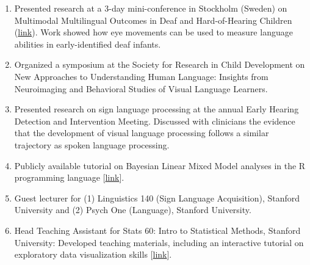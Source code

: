 \documentclass[svgnames,11pt]{article}
\begin{document}
\begin{enumerate}
\item Presented research at a 3-day mini-conference in Stockholm (Sweden) on Multimodal Multilingual Outcomes in Deaf and Hard-of-Hearing Children (\href{https://www.ntid.rit.edu/mmoworkshop/}{link}). Work showed how eye movements can be used to measure language abilities in early-identified deaf infants.
\item Organized a symposium at the Society for Research in Child Development on New Approaches to Understanding Human Language: Insights from Neuroimaging and Behavioral Studies of Visual Language Learners. 
\item Presented research on sign language processing at the annual Early Hearing Detection and Intervention Meeting. Discussed with clinicians the evidence that the development of visual language processing follows a similar trajectory as spoken language processing.
\item Publicly available tutorial on Bayesian Linear Mixed Model analyses in the R programming language [\href{https://kemacdonald.com/materials/langcog_rstanarm_tutorial_sleep.nb.html}{link}].
\item Guest lecturer for (1) Linguistics 140 (Sign Language Acquisition), Stanford University and (2) Psych One (Language), Stanford University.
\item Head Teaching Assistant for Stats 60: Intro to Statistical Methods, Stanford University: Developed teaching materials, including an interactive tutorial on exploratory data visualization skills [\href{https://kemacdonald.com/materials/P10_section_week9_viz_students.html}{link}].

\end{enumerate}
\end{document}
